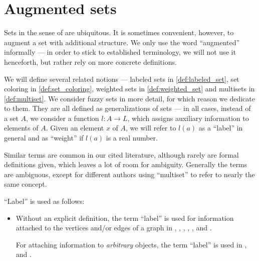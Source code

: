 \section{Augmented sets}\label{sec:augmented_sets}

Sets in the sense of  are ubiquitous. It is sometimes convenient, however, to augment a set with additional structure. We only use the word \enquote{augmented} informally --- in order to stick to established terminology, we will not use it henceforth, but rather rely on more concrete definitions.

\begin{remark}\label{rem:set_labeling_terminology}
  We will define several related notions --- labeled sets in \cref{def:labeled_set}, set coloring in \cref{def:set_coloring}, weighted sets in \cref{def:weighted_set} and multisets in \cref{def:multiset}. We consider fuzzy sets in more detail, for which reason we dedicate  to them. They are all defined as generalizations of sets --- in all cases, instead of a set \( A \), we consider a function \( l: A \to L \), which assigns auxiliary information to elements of \( A \). Given an element \( x \) of \( A \), we will refer to \( l(a) \) as a \enquote{label} in general and as \enquote{weight} if \( l(a) \) is a real number.

  Similar terms are common in our cited literature, although rarely are formal definitions given, which leaves a lot of room for ambiguity. Generally the terms are ambiguous, except for different authors using \enquote{multiset} to refer to nearly the same concept.

  \begin{thmenum}
     \enquote{Label} is used as follows:
    \begin{itemize}
      \item Without an explicit definition, the term \enquote{label} is used for information attached to the vertices and/or edges of a graph in
      \cite{Bollobás1998ModernGraphTheory},
      \cite[20]{Harary1969GraphTheory},
      \cite[242]{Diestel2017GraphTheory},
      \cite{Salomaa1973FormalLanguages},
      \cite{Mimram2020ProgramEqualsProof},
      \cite{CitkinMuravitsky2022ConsequenceRelations} and
      \cite{Erickson2019Algorithms}.

      For attaching information to \emph{arbitrary} objects, the term \enquote{label} is used in
      \cite{Rosen2019DiscreteMathematics},
      \cite{Stanley2012EnumerativeCombinatoricsVol1} and
      \cite[315]{Knuth1997ArtVol1}.
    \end{itemize}


\end{thmenum}
\end{remark}

